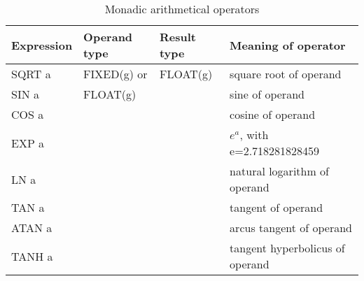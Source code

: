 \begin{table} %
\begin{center}
\caption{Monadic arithmetical operators}
\label{tab73}
\vspace{5mm}
\begin{tabular}{|l|l|l|l|}
\hline 
{\bf Expression} & {\bf Operand type} & {\bf Result type} & {\bf Meaning of operator}\\ \hline
SQRT a           & FIXED(g) or        & FLOAT(g)          & square root of operand \\ \cline{1-1} \cline{4-4}
SIN a            & FLOAT(g)           &                   & sine of operand \\ \cline{1-1} \cline{4-4}
COS a            &                    &                   & cosine of operand \\ \cline{1-1} \cline{4-4}
EXP a            &                    &                   & $e^{a}$, with e=2.718281828459\\ \cline{1-1} \cline{4-4}
LN a             &                    &                   & natural logarithm of operand\\ \cline{1-1} \cline{4-4}
TAN a            &                    &                   & tangent of operand \\ \cline{1-1} \cline{4-4}
ATAN a           &                    &                   & arcus tangent of operand\\ \cline{1-1} \cline{4-4}
TANH a           &                    &                   & tangent hyperbolicus of operand\\
\hline
\end{tabular}
\end{center}
\end{table}

